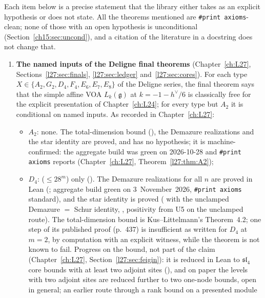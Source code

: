 Each item below is a precise statement that the library either takes as an explicit hypothesis or does not state. All
the theorems mentioned are \texttt{\#print axioms}-clean; none of those with an open hypothesis is unconditional
(Section~\ref{ch15:sec:uncond}), and a citation of the literature in a docstring does not change that.

\begin{enumerate}
\item \textbf{The named inputs of the Deligne final theorems} (Chapter~\ref{ch:L27}, Sections~\ref{l27:sec:finals},
  \ref{l27:sec:ledger} and~\ref{l27:sec:cores}). For each type $X\in\{A_2,G_2,D_4,F_4,E_6,E_7,E_8\}$ of the Deligne series,
  the final theorem  says that the simple affine VOA $L_k(\mathfrak g)$ at
  $k=-1-h^\vee/6$ is classically free for the explicit presentation of Chapter~\ref{ch:L24}; for every type but $A_2$ it is
  conditional on named inputs. As recorded in Chapter~\ref{ch:L27}:
  \begin{itemize}
  \item $A_2$: none. The total-dimension bound (), the Demazure realizations and the star
    identity are proved, and  has no hypothesis; it is machine-confirmed: the aggregate build was
    green on 2026-10-28 and \texttt{\#print axioms} reports  (Chapter~\ref{ch:L27}, Theorem~\ref{l27:thm:A2});
  \item $D_4$:  ($\le28^m$) only (). The Demazure
    realizations for all $n$ are proved in Lean (; aggregate build green on
    3~November~2026, \texttt{\#print axioms} standard), and the star identity is proved ( with the unclamped
    Demazure $=$ Schur identity, , positivity from U5 on the unclamped route).
    The total-dimension bound is Kus--Littelmann's Theorem~4.2; one step of its published proof (p.~437) is insufficient as
    written for $D_4$ at $m=2$, by computation with an explicit witness, while the theorem is not known to fail. Progress on
    the bound, not part of the claim (Chapter~\ref{ch:L27}, Section~\ref{l27:sec:feigin}): it is reduced in Lean to $\mathfrak{sl}_4$ core bounds with at
    least two adjoint sites (), and on paper the levels with two adjoint sites
    are reduced further to two one-node bounds, open in general; an earlier route through a rank bound on a presented module

\end{itemize}
\end{enumerate}
